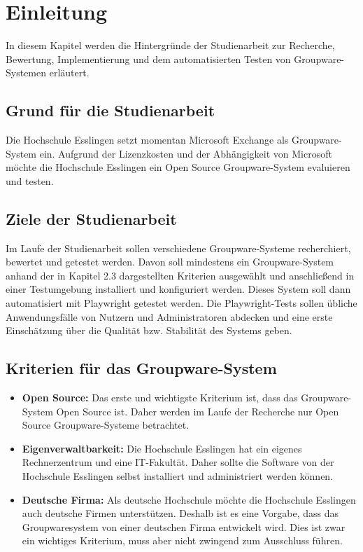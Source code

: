 \chapter{Einleitung}

In diesem Kapitel werden die Hintergründe der Studienarbeit zur Recherche, Bewertung, Implementierung und dem automatisierten Testen von Groupware-Systemen erläutert.

\section{Grund für die Studienarbeit}

Die Hochschule Esslingen setzt momentan Microsoft Exchange als Groupware-System ein.
Aufgrund der Lizenzkosten und der Abhängigkeit von Microsoft möchte die Hochschule Esslingen ein Open Source Groupware-System evaluieren und testen.


\section{Ziele der Studienarbeit}

Im Laufe der Studienarbeit sollen verschiedene Groupware-Systeme recherchiert, bewertet und getestet werden.
Davon soll mindestens ein Groupware-System anhand der in Kapitel 2.3 dargestellten Kriterien ausgewählt und anschließend in einer Testumgebung installiert und konfiguriert werden.
Dieses System soll dann automatisiert mit Playwright getestet werden.
Die Playwright-Tests sollen übliche Anwendungsfälle von Nutzern und Administratoren abdecken und eine erste Einschätzung über die Qualität bzw. Stabilität des Systems geben.



\section{Kriterien für das Groupware-System}
\begin{itemize}
    \item \textbf{Open Source:} 
    Das erste und wichtigste Kriterium ist, dass das Groupware-System Open Source ist.
    Daher werden im Laufe der Recherche nur Open Source Groupware-Systeme betrachtet.
    \item \textbf{Eigenverwaltbarkeit:}
    Die Hochschule Esslingen hat ein eigenes Rechnerzentrum und eine IT-Fakultät.
    Daher sollte die Software von der Hochschule Esslingen selbst installiert und administriert werden können.
    \item \textbf{Deutsche Firma:}
    Als deutsche Hochschule möchte die Hochschule Esslingen auch deutsche Firmen unterstützen.
    Deshalb ist es eine Vorgabe, dass das Groupwaresystem von einer deutschen Firma entwickelt wird.
    Dies ist zwar ein wichtiges Kriterium, muss aber nicht zwingend zum Ausschluss führen.
    
\end{itemize}
